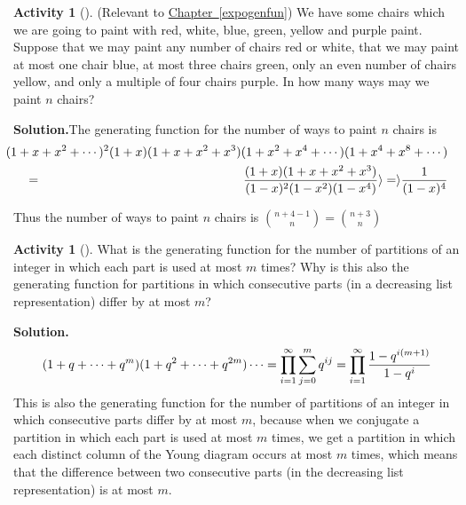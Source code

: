 \documentclass[10pt,]{book}
\theoremstyle{plain}
\theoremstyle{definition}
\newtheorem{activity}[project]{Activity}
\numberwithin{equation}{chapter}
\newcommand{\amp}{&}
\begin{document}
\begin{activity}[]\label{activity-204}
(Relevant to \hyperref[expogenfun]{Chapter~\ref{expogenfun}}) We have some chairs which we are going to paint with red, white, blue, green, yellow and purple paint. Suppose that we may paint any number of chairs red or white, that we may paint at most one chair blue, at most three chairs green, only an even number of chairs yellow, and only a multiple of four chairs purple. In how many ways may we paint \(n\) chairs?%
\par\medskip\noindent%
\textbf{Solution.}\quad The generating function for the number of ways to paint \(n\) chairs is%
\begin{align*}
\amp \amp \hspace{-.5in}(1+x+x^2+\cdots)^2(1+x)(1+x+x^2+x^3)(1+x^2+x^4+\cdots)
(1+x^4+x^8+\cdots)\\
\amp =\amp 
\frac{(1+x)(1+x+x^2+x^3)}{(1-x)^2(1-x^2)(1-x^4)}\rangle =\rangle  \frac{1}{(1-x)^4}
\end{align*}
%
\par
Thus the number of ways to paint \(n\) chairs is \(\binom{n+4-1}{n}=\binom{n+3}{n}\)%
\end{activity}
\begin{activity}[]\label{activity-205}
What is the generating function for the number of partitions of an integer in which each part is used at most \(m\) times? Why is this also the generating function for partitions in which consecutive parts (in a decreasing list representation) differ by at most \(m\)?%
\par\medskip\noindent%
\textbf{Solution.}\quad %
\begin{equation*}
(1+q+\cdots+q^m)(1+q^2 +\cdots+q^{2m})\cdots 
=\prod_{i=1}^\infty\sum_{j=0}^m q^{ij}\\
=\prod_{i=1}^\infty {1-q^{i(m+1)}\over 1-q^i}
\end{equation*}
This is also the generating function for the number of partitions of an integer in which consecutive parts differ by at most \(m\), because when we conjugate a partition in which each part is used at most \(m\) times, we get a partition in which each distinct column of the Young diagram occurs at most \(m\) times, which means that the difference between two consecutive parts (in the decreasing list representation) is at most \(m\).%
\end{activity}
\typeout{************************************************}
\typeout{************************************************}
\end{document}
